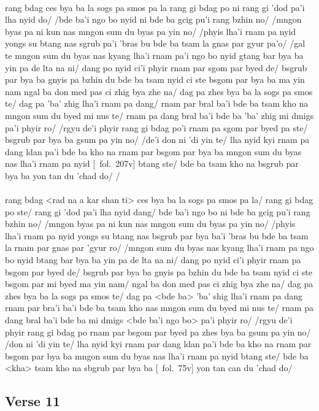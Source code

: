 \documentclass[12pt]{article}
\begin{document}
\textbf{\TVA}\\
rang bdag ces bya ba la sogs pa smos pa la rang gi bdag po ni rang gi 'dod pa'i lha nyid do/ /bde ba'i ngo bo nyid ni bde ba gcig pu'i rang bzhin no/ /mngon byas pa ni kun nas mngon sum du byas pa yin no/ /phyis lha'i rnam pa nyid yongs su btang nas sgrub pa'i 'bras bu bde ba tsam la gnas par gyur pa'o/ /gal te mngon sum du byas nas kyang lha'i rnam pa'i ngo bo nyid gtang bar bya ba yin pa de lta na ni/ dang po nyid ci'i phyir rnam par sgom par byed de/ bsgrub par bya ba gnyis pa bzhin du bde ba tsam nyid ci ste bsgom par bya ba ma yin nam ngal ba don med pas ci zhig bya zhe na/ dag pa zhes bya ba la sogs pa smos te/ dag pa 'ba' zhig lha'i rnam pa dang/ rnam par bral ba'i bde ba tsam kho na mngon sum du byed mi nus te/ rnam pa dang bral ba'i bde ba 'ba' zhig mi dmigs pa'i phyir ro/ /rgyu de'i phyir rang gi bdag po'i rnam pa sgom par byed pa ste/ bsgrub par bya ba gsum pa yin no/ /de'i don ni 'di yin te/ lha nyid kyi rnam pa dang ldan pa'i bde ba kho na rnam par bsgom par bya ba mngon sum du byas nas lha'i rnam pa nyid [\TVA\ fol.\ 207v] btang ste/ bde ba tsam kho na bsgrub par bya ba yon tan du 'chad do/ /\\

\textbf{\TVB}\\
rang bdag <rad na a kar shan ti> ces bya ba la sogs pa smos pa la/ rang gi bdag po ste/ rang gi 'dod pa'i lha nyid dang/ bde ba'i ngo bo ni bde ba gcig pu'i rang bzhin no/ /mngon byas pa ni kun nas mngon sum du byas pa yin no/ /phyis lha'i rnam pa nyid yongs su btang nas bsgrub par bya ba'i 'bras bu bde ba tsam la rnam par gnas par 'gyur ro/ /mngon sum du byas nas kyang lha'i rnam pa ngo bo nyid btang bar bya ba yin pa de lta na ni/ dang po nyid ci'i phyir rnam pa bsgom par byed de/ bsgrub par bya ba gnyis pa bzhin du bde ba tsam nyid ci ste bsgom par mi byed ma yin nam/ ngal ba don med pas ci zhig bya zhe na/ dag pa zhes bya ba la sogs pa smos te/ dag pa <bde ba> 'ba' shig lha'i rnam pa dang rnam par bra'i ba'i bde ba tsam kho nas mngon sum du byed mi nus te/ rnam pa dang bral ba'i bde ba mi dmigs <bde ba'i ngo bo> pa'i phyir ro/ /rgyu de'i phyir rang gi bdag po rnam par bsgom par byed pa zhes bya ba gsum pa yin no/ /don ni 'di yin te/ lha nyid kyi rnam par dang ldan pa'i bde ba kho na rnam par bsgom par bya ba mngon sum du byas nas lha'i rnam pa nyid btang ste/ bde ba <kha> tsam kho na sbgrub par bya ba [\TVB\ fol.\ 75v] yon tan can du 'chad do/ 

\subsection{Verse 11}
\end{document}
